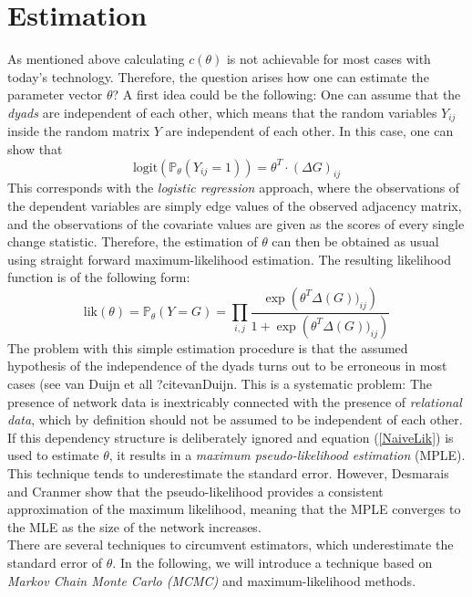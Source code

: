 \documentclass[headsepline=true, abstracton]{scrartcl}
\begin{document}
\section*{Estimation}
As mentioned above calculating $c(\theta)$ is not achievable for most cases with today's technology. Therefore, the question arises how one can estimate the parameter vector $\theta$?
A first idea could be the following: One can assume that the \textit{dyads} are independent of each other, which means that the random variables $Y_{ij}$ inside the random matrix $Y$ are independent of each other. 
In this case, one can show that
%
\begin{equation*}
\text{logit}(\mathbb{P}_{\theta}(Y_{ij}=1))= \theta^T \cdot (\Delta G)_{ij}
\end{equation*}
This corresponds with the \textit{logistic regression} approach, where the observations of the dependent variables are simply edge values of the observed adjacency matrix, and the observations of the covariate values are given as the scores of every single change statistic. Therefore, the estimation of $\theta$ can then be obtained as usual using straight forward maximum-likelihood estimation. The resulting likelihood function is of the following form:
\begin{equation}
\text{lik}(\theta)= \mathbb{P}_{\theta}(Y=G)= \prod_{i,j} \dfrac{ \exp \left(\theta^T \Delta(G))_{ij} \right)}{1+\exp \left(\theta^T \Delta(G))_{ij} \right)}
\label{NaiveLik}
\end{equation}
The problem with this simple estimation procedure is that the assumed hypothesis of the independence of the dyads turns out to be erroneous in most cases (see van Duijn et all ?citevanDuijn. This is a systematic problem: The presence of network data is inextricably connected with the presence of \textit{relational data}, which by definition should not be assumed to be independent of each other. If this dependency structure is deliberately ignored and equation (\ref{NaiveLik}) is used to estimate $\theta$, it results in a \textit{maximum pseudo-likelihood estimation} (MPLE). This technique tends to underestimate the standard error. However, Desmarais and Cranmer \cite{Desmarais.2012} show that the pseudo-likelihood provides a consistent approximation of the maximum likelihood, meaning that the MPLE converges to the MLE as the size of the network increases.\\[0.3cm]
There are several techniques to circumvent estimators, which underestimate the standard error of $\theta$. In the following, we will introduce a technique based on \textit{Markov Chain Monte Carlo (MCMC)} and maximum-likelihood methods.\\[0.3cm]
\end{document}
